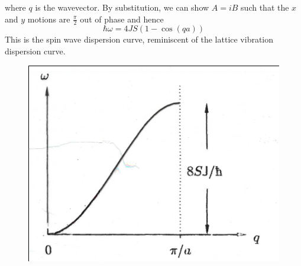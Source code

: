 \documentclass[a4paper, 11pt, normalem]{report}
\begin{document}
where $q$ is the wavevector. 
By substitution, we can show $A = iB$ such that the $x$ and $y$ motions are $\frac{\pi}{2}$ out of phase and hence
\begin{equation}
    \hbar\omega = 4JS(1-\cos(qa))
\end{equation}
This is the spin wave dispersion curve, reminiscent of the lattice vibration dispersion curve.
\begin{figure}[H]
    \centering
    \includegraphics[scale=0.5]{spinwave.png}
\end{figure}
\end{document}
